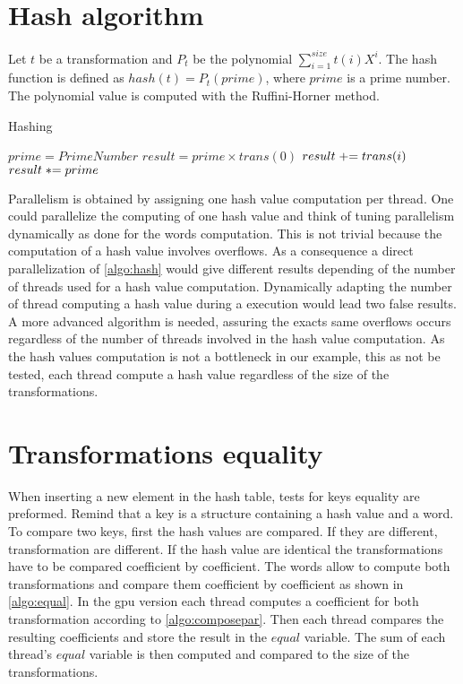 {\section{Hash algorithm}
Let $t$ be a transformation and $P_{t}$ be the polynomial $\displaystyle\sum_{i=1}^{size} t(i)X^i$. The hash function is defined as $hash(t) = P_{t}(prime)$, where $prime$ is a prime number.
The polynomial value is computed with the Ruffini-Horner method.
\begin{algorithm}
\caption{Hashing}
\label{algo:hash}
\begin{algorithmic}
\STATE $prime = PrimeNumber$
\STATE $result = prime \times trans(0)$
\STATE $\switch result += trans(i)$
\STATE $\switch result *= prime$
\ENDFOR
\end{algorithmic}
\end{algorithm}
Parallelism is obtained by assigning one hash value computation per thread.
One could parallelize the computing of one hash value and think of tuning parallelism dynamically as done for the words computation. This is not trivial because the computation of a hash value involves overflows. As a consequence a direct parallelization of \autoref{algo:hash} would give different results depending of the number of threads used for a hash value computation. Dynamically adapting the number of thread computing a hash value during a execution would lead two false results. A more advanced algorithm is needed, assuring the exacts same overflows occurs regardless of the number of threads involved in the hash value computation. As the hash values computation is not a bottleneck in our example, this as not be tested, each thread compute a hash value regardless of the size of the transformations.


\section{Transformations equality}
\label{part:equality}
When inserting a new element in the hash table, tests for keys equality are preformed.
Remind that a key is a structure containing a hash value and a word.
To compare two keys, first the hash values are compared. If they are different, transformation are different.
If the hash value are identical the transformations have to be compared coefficient by coefficient. The words allow to compute both transformations and compare them coefficient by coefficient as shown in \autoref{algo:equal}.
In the \gls{gpu} version each thread computes a coefficient for both transformation according to \autoref{algo:composepar}. Then each thread compares the resulting coefficients and store the result in the $equal$ variable. The sum of each thread's $equal$ variable is then computed and compared to the size of the transformations.

}
